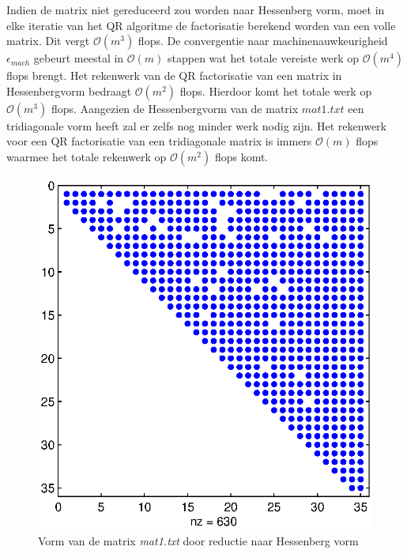 \documentclass[a4paper]{article}
\begin{document}
Indien de matrix niet gereduceerd zou worden naar Hessenberg vorm, moet in elke iteratie van het QR algoritme de factorisatie berekend worden van een volle matrix. Dit vergt $\mathcal{O}(m^{3})$ flops. De convergentie naar machinenauwkeurigheid $\epsilon _{mach}$ gebeurt meestal in $\mathcal{O}(m)$ stappen wat het totale vereiste werk op $\mathcal{O}(m^{4})$ flops brengt. Het rekenwerk van de QR factorisatie van een matrix in Hessenbergvorm bedraagt $\mathcal{O}(m^{2})$ flops. Hierdoor komt het totale werk op $\mathcal{O}(m^{3})$ flops. Aangezien de Hessenbergvorm van de matrix $mat1.txt$ een tridiagonale vorm heeft zal er zelfs nog minder werk nodig zijn. Het rekenwerk voor een QR factorisatie van een tridiagonale matrix is immers $\mathcal{O}(m)$ flops waarmee het totale rekenwerk op $\mathcal{O}(m^{2})$ flops komt.
\begin{figure}[H]
\begin{minipage}[t]{0.45\linewidth}
\centering
\centerline{\includegraphics[scale=0.45]{pictures/opgave4Hessenberg1.eps}}
\caption{Vorm van de matrix \textit{mat1.txt} door reductie naar Hessenberg vorm}
\label{fig:figure1}
\end{minipage}
\hfill
\begin{minipage}[t]{0.45\linewidth}
\centering

\end{minipage}
\end{figure}
\end{document}

